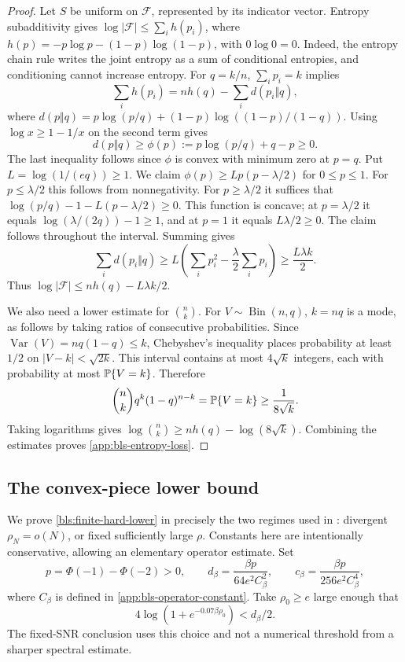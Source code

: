 \begin{proof}
Let $S$ be uniform on $\mathcal F$, represented by its indicator vector.
Entropy subadditivity gives
$\log|\mathcal F|\le\sum_i h(p_i)$, where
$h(p)=-p\log p-(1-p)\log(1-p)$, with $0\log0=0$.
Indeed, the entropy chain rule writes the joint entropy as a sum of
conditional entropies, and conditioning cannot increase entropy.
For $q=k/n$, $\sum_i p_i=k$ implies
\[
 \sum_i h(p_i)=nh(q)-\sum_i d(p_i\Vert q),
\]
where $d(p\Vert q)=p\log(p/q)+(1-p)\log((1-p)/(1-q))$.
Using $\log x\ge1-1/x$ on the second term gives
\[
 d(p\Vert q)\ge\phi(p):=p\log(p/q)+q-p\ge0.
\]
The last inequality follows since $\phi$ is convex with minimum zero at
$p=q$.  Put $L=\log(1/(eq))\ge1$.
We claim $\phi(p)\ge Lp(p-\lambda/2)$ for $0\le p\le1$.
For $p\le\lambda/2$ this follows from nonnegativity.
For $p\ge\lambda/2$ it suffices that
$\log(p/q)-1-L(p-\lambda/2)\ge0$.
This function is concave; at $p=\lambda/2$ it equals
$\log(\lambda/(2q))-1\ge1$, and at $p=1$ it equals
$L\lambda/2\ge0$.  The claim follows throughout the interval.
Summing gives
\[
 \sum_i d(p_i\Vert q)
 \ge L\left(\sum_i p_i^2-\frac\lambda2\sum_i p_i\right)
 \ge\frac{L\lambda k}{2}.
\]
Thus $\log|\mathcal F|\le nh(q)-L\lambda k/2$.

We also need a lower estimate for $\binom nk$.
For $V\sim\operatorname{Bin}(n,q)$, $k=nq$ is a mode, as follows by
taking ratios of consecutive probabilities.  Since
$\operatorname{Var}(V)=nq(1-q)\le k$, Chebyshev's inequality places
probability at least $1/2$ on $|V-k|<\sqrt{2k}$.
This interval contains at most $4\sqrt k$ integers, each with probability
at most $\mathbb{P}\{V=k\}$.  Therefore
\[
 \binom nk q^k(1-q)^{n-k}=\mathbb{P}\{V=k\}
 \ge\frac1{8\sqrt k}.
\]
Taking logarithms gives
$\log\binom nk\ge nh(q)-\log(8\sqrt k)$.
Combining the estimates proves \eqref{app:bls-entropy-loss}.
\end{proof}

\subsection{The convex-piece lower bound}
\label{app:bls-hard-lower-proof}

We prove \eqref{bls:finite-hard-lower} in precisely the two regimes used
in : divergent $\rho_N=o(N)$, or fixed
sufficiently large $\rho$.  Constants here are intentionally
conservative, allowing an elementary operator estimate.
Set
\begin{equation}
 p=\Phi(-1)-\Phi(-2)>0,\qquad
 d_\beta=\frac{\beta p}{64e^2C_\beta^2},\qquad
 c_\beta=\frac{\beta p}{256e^2C_\beta^4},
 \label{app:bls-hard-constants}
\end{equation}
where $C_\beta$ is defined in \eqref{app:bls-operator-constant}.
Take $\rho_0\ge e$ large enough that
\begin{equation}
 4\log(1+e^{-0.07\beta\rho_0})<d_\beta/2.
 \label{app:bls-rho-zero-choice}
\end{equation}
The fixed-SNR conclusion uses this choice and not a numerical threshold
from a sharper spectral estimate.

